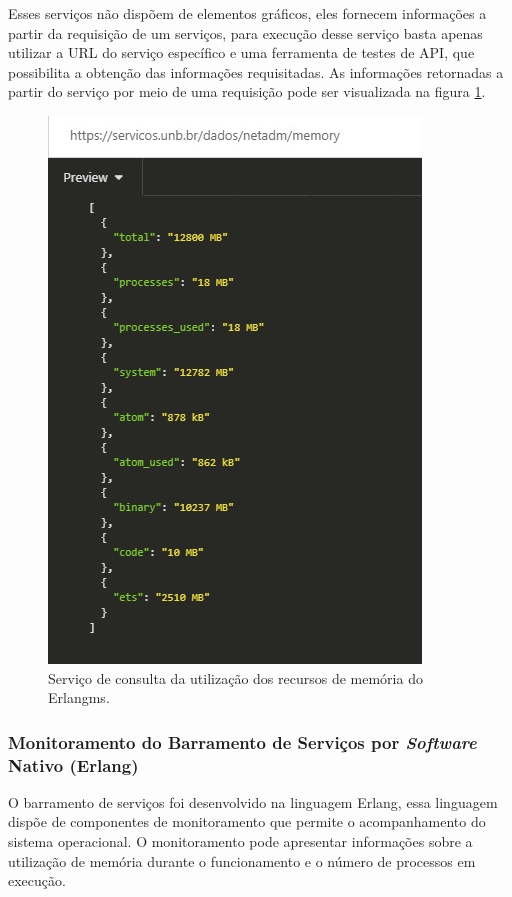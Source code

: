 Esses serviços não dispõem de elementos gráficos, eles fornecem informações a partir da requisição de um serviços, para execução desse serviço basta apenas utilizar a \acrshort{URL} do serviço específico e uma ferramenta de testes de \acrshort{API}, que possibilita a obtenção das informações requisitadas. As informações retornadas a partir do serviço por meio de uma requisição pode ser visualizada na figura \ref{fun:fig:memoriaEMS}.

\begin{figure}[H]
	\begin{center}
	\includegraphics[scale = 0.90]{img/monitoramentoEMS.jpg}
		\caption{Serviço de consulta da utilização dos recursos de memória do Erlangms.}
		\label{fun:fig:memoriaEMS}
	\end{center}
\end{figure}

\subsubsection{Monitoramento do Barramento de Serviços por \textit{Software} Nativo (Erlang)}
O barramento de serviços foi desenvolvido na linguagem Erlang, essa linguagem dispõe de componentes de monitoramento que permite o acompanhamento do sistema operacional. O monitoramento pode apresentar informações sobre a utilização de memória durante o funcionamento e o número de processos em execução. 

